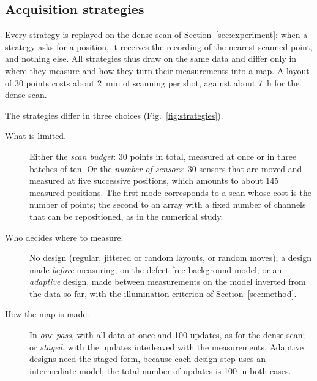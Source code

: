 
\subsection{Acquisition strategies}\label{sec:lab-protocols}

Every strategy is replayed on the dense scan of Section~\ref{sec:experiment}: when a strategy asks for a position, it
receives the recording of the nearest scanned point, and nothing else. All strategies thus draw on the same data and
differ only in where they measure and how they turn their measurements into a map. A layout of 30 points costs about
\SI{2}{min} of scanning per shot, against about \SI{7}{h} for the dense scan.

The strategies differ in three choices (Fig.~\ref{fig:strategies}).
\begin{description}
\item[What is limited.] Either the \emph{scan budget}: 30 points in total, measured at once or in three batches of
  ten. Or the \emph{number of sensors}: 30 sensors that are moved and measured at five successive positions, which
  amounts to about 145 measured positions. The first mode corresponds to a scan whose cost is the number of points;
  the second to an array with a fixed number of channels that can be repositioned, as in the numerical study.
\item[Who decides where to measure.] No design (regular, jittered or random layouts, or random moves); a design made
  \emph{before} measuring, on the defect-free background model; or an \emph{adaptive} design, made between
  measurements on the model inverted from the data so far, with the illumination criterion of
  Section~\ref{sec:method}.
\item[How the map is made.] In \emph{one pass}, with all data at once and 100 updates, as for the dense scan; or
  \emph{staged}, with the updates interleaved with the measurements. Adaptive designs need the staged form, because
  each design step uses an intermediate model; the total number of updates is 100 in both cases.
\end{description}

